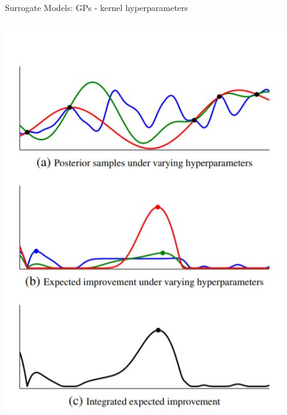 \begin{frame}[c]{Surrogate Models: GPs - kernel hyperparameters}
\begin{columns}[T]
\begin{column}{.38\textwidth}
\includegraphics[width=0.9\textwidth]{w06_hpo_bo/images/surrogate_models/kernel_hp_mcmc.jpg}
\end{column}%
\end{columns}

\end{frame}

